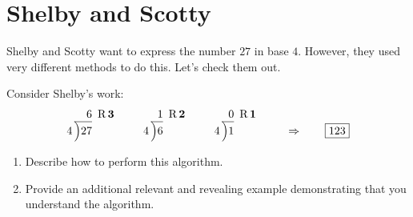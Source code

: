 \newpage
\section{Shelby and Scotty}\label{A:SS}

Shelby and Scotty want to express the number $27$ in base
$4$. However, they used very different methods to do this. Let's check
them out.







\begin{prob} Consider Shelby's work:
\[
4\,\begin{tabular}[b]{@{}r@{} r}
$6$ &\, R\,$\boldsymbol{3}$\\ \cline{1-1}
\Big)\begin{tabular}[t]{@{}l@{}}
$27$ 
\end{tabular}
\end{tabular}
\qquad
4\,\begin{tabular}[b]{@{}r@{} r}
$1$ &\, R\,$\boldsymbol{2}$\\ \cline{1-1}
\Big)\begin{tabular}[t]{@{}l@{}}
$6$ 
\end{tabular}
\end{tabular}
\qquad
4\,\begin{tabular}[b]{@{}r@{} r}
$0$ &\, R\,$\boldsymbol{1}$\\ \cline{1-1}
\Big)\begin{tabular}[t]{@{}l@{}}
$1$ 
\end{tabular}
\end{tabular} \qquad \Rightarrow \qquad \fbox{$123$}
\]
\begin{enumerate}
\item Describe how to perform this algorithm.
\item Provide an additional relevant and revealing example
  demonstrating that you understand the algorithm.
\end{enumerate}
\end{prob}




